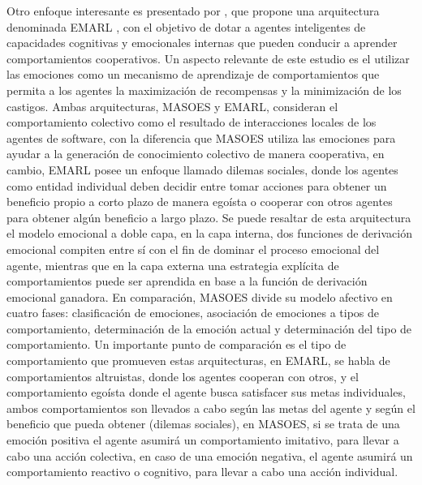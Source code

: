 Otro enfoque interesante es presentado por \cite{yu2015}, que propone una
arquitectura denominada EMARL ,
con el objetivo de dotar a agentes inteligentes de
capacidades cognitivas y emocionales internas que pueden conducir a aprender
comportamientos cooperativos. Un aspecto relevante de este estudio es el
utilizar las emociones como un mecanismo de aprendizaje de comportamientos que
permita a los agentes la maximización de recompensas y la minimización de los
castigos. Ambas arquitecturas, MASOES y EMARL, consideran el comportamiento
colectivo como el resultado de interacciones locales de los agentes de software,
con la diferencia que MASOES utiliza las emociones para ayudar a la generación
de conocimiento colectivo de manera cooperativa, en cambio, EMARL posee un
enfoque llamado dilemas sociales, donde los agentes como entidad individual
deben decidir entre tomar acciones para obtener un beneficio propio a corto
plazo de manera egoísta o cooperar con otros agentes para obtener algún
beneficio a largo plazo. Se puede resaltar de esta arquitectura el modelo
emocional a doble capa, en la capa interna, dos funciones de derivación
emocional compiten entre sí con el fin de dominar el proceso emocional del
agente, mientras que en la capa externa una estrategia explícita de
comportamientos puede ser aprendida en base a la función de derivación emocional
ganadora. En comparación, MASOES divide su modelo afectivo en cuatro fases:
clasificación de emociones, asociación de emociones a tipos de comportamiento,
determinación de la emoción actual y determinación del tipo de comportamiento.
Un importante punto de comparación es el tipo de comportamiento que promueven
estas arquitecturas, en EMARL, se habla de comportamientos altruistas, donde los
agentes cooperan con otros, y el comportamiento egoísta donde el agente busca
satisfacer sus metas individuales, ambos comportamientos son llevados a cabo
según las metas del agente y según el beneficio que pueda obtener (dilemas
sociales), en MASOES, si se trata de una emoción positiva el agente asumirá un
comportamiento imitativo, para llevar a cabo una acción colectiva, en caso de
una emoción negativa, el agente asumirá un comportamiento reactivo o cognitivo,
para llevar a cabo una acción individual.



